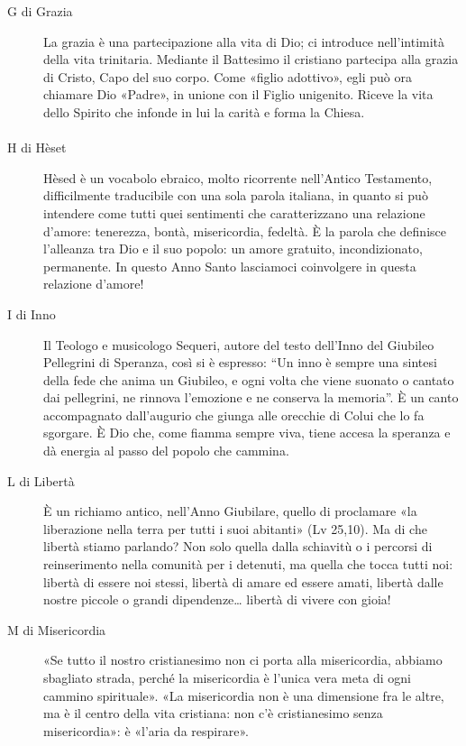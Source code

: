 \begin{description}
  \item[G di Grazia] La grazia è una partecipazione alla vita di Dio; ci introduce nell’intimità della vita trinitaria. Mediante il Battesimo il cristiano partecipa alla grazia di Cristo, Capo del suo corpo. Come «figlio adottivo», egli può ora chiamare Dio «Padre», in unione con il Figlio unigenito. Riceve la vita dello Spirito che infonde in lui la carità e forma la Chiesa.
\end{description}

\paragraph{}
\vspace*{-\parskip}

\begin{description}

  \item[H di Hèset] Hèsed è un vocabolo ebraico, molto ricorrente nell’Antico Testamento, difficilmente traducibile con una sola parola italiana, in quanto si può intendere come tutti quei sentimenti che caratterizzano una relazione d’amore: tenerezza, bontà, misericordia, fedeltà. È la parola che definisce l’alleanza tra Dio e il suo popolo: un amore gratuito, incondizionato, permanente. In questo Anno Santo lasciamoci coinvolgere in questa relazione d’amore!
\end{description}

\begin{description}
  \item[I di Inno] Il Teologo e musicologo Sequeri, autore del testo dell’Inno del Giubileo Pellegrini di Speranza, così si è espresso: “Un inno è sempre una sintesi della fede che anima un Giubileo, e ogni volta che viene suonato o cantato dai pellegrini, ne rinnova l’emozione e ne conserva la memoria”. È un canto accompagnato dall’augurio che giunga alle orecchie di Colui che lo fa sgorgare. È Dio che, come fiamma sempre viva, tiene accesa la speranza e dà energia al passo del popolo che cammina.

  \item[L di Libertà] È un richiamo antico, nell’Anno Giubilare, quello di proclamare «la liberazione nella terra per tutti i suoi abitanti» (Lv 25,10). Ma di che libertà stiamo parlando? Non solo quella dalla schiavitù o i percorsi di reinserimento nella comunità per i detenuti, ma quella che tocca tutti noi: libertà di essere noi stessi, libertà di amare ed essere amati, libertà dalle nostre piccole o grandi dipendenze… libertà di vivere con gioia!

  \item[M di Misericordia] «Se tutto il nostro cristianesimo non ci porta alla misericordia, abbiamo sbagliato strada, perché la misericordia è l’unica vera meta di ogni cammino spirituale». «La misericordia non è una dimensione fra le altre, ma è il centro della vita cristiana: non c’è cristianesimo senza misericordia»: è «l’aria da respirare».
\end{description}
